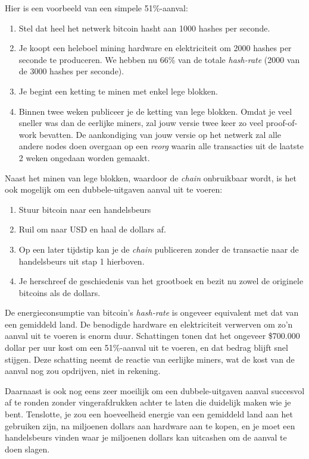 Hier is een voorbeeld van een simpele 51\%-aanval:

\begin{enumerate}
\item Stel dat heel het netwerk bitcoin hasht aan 1000 hashes per seconde.
\item Je koopt een heleboel mining hardware en elektriciteit om 2000 hashes per seconde te produceren. We hebben nu 66\% van de totale \textit{hash-rate} (2000 van de 3000 hashes per seconde).
\item Je begint een ketting te minen met enkel lege blokken.
\item Binnen twee weken publiceer je de ketting van lege blokken. Omdat je veel sneller was dan de eerlijke miners, zal jouw versie twee keer zo veel proof-of-work bevatten. De aankondiging van jouw versie op het netwerk zal alle andere nodes doen overgaan op een \textit{reorg} waarin alle transacties uit de laatste 2 weken ongedaan worden gemaakt.
\end{enumerate}
Naast het minen van lege blokken, waardoor de \textit{chain} onbruikbaar wordt, is het ook mogelijk om een dubbele-uitgaven aanval uit te voeren:

\begin{enumerate}
\item Stuur bitcoin naar een handelsbeurs
\item Ruil om naar USD en haal de dollars af.
\item Op een later tijdstip kan je de\textit{ chain} publiceren zonder de transactie naar de handelsbeurs uit stap 1 hierboven.
\item Je herschreef de geschiedenis van het grootboek en bezit nu zowel de originele bitcoins als de dollars.
\end{enumerate}
De energieconsumptie van bitcoin’s \textit{hash-rate} is ongeveer equivalent met dat van een gemiddeld land. De benodigde hardware en elektriciteit verwerven om zo’n aanval uit te voeren is enorm duur. Schattingen tonen dat het ongeveer \$700.000 dollar per uur kost om een 51\%-aanval uit te voeren, en dat bedrag blijft snel stijgen. Deze schatting neemt de reactie van eerlijke miners, wat de kost van de aanval nog zou opdrijven, niet in rekening.

Daarnaast is ook nog eens zeer moeilijk om een dubbele-uitgaven aanval succesvol af te ronden zonder vingerafdrukken achter te laten die duidelijk maken wie je bent. Tenslotte, je zou een hoeveelheid energie van een gemiddeld land aan het gebruiken zijn, na miljoenen dollars aan hardware aan te kopen, en je moet een handelsbeurs vinden waar je miljoenen dollars kan uitcashen om de aanval te doen slagen.

